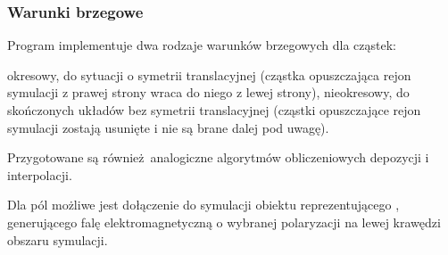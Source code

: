 


\subsubsection{Warunki brzegowe}
Program implementuje dwa rodzaje warunków brzegowych dla cząstek:
\begin{itemize}
\itemi{} okresowy, do sytuacji o symetrii translacyjnej (cząstka opuszczająca rejon symulacji z prawej strony wraca do niego z lewej strony),
\itemi{} nieokresowy, do skończonych układów bez symetrii translacyjnej (cząstki opuszczające rejon symulacji zostają usunięte i nie są brane
dalej pod uwagę).
\end{itemize}

Przygotowane są również analogiczne  
algorytmów obliczeniowych depozycji i interpolacji.

Dla pól możliwe jest dołączenie do symulacji obiektu reprezentującego ,
generującego falę elektromagnetyczną o wybranej polaryzacji na lewej krawędzi obszaru symulacji.
